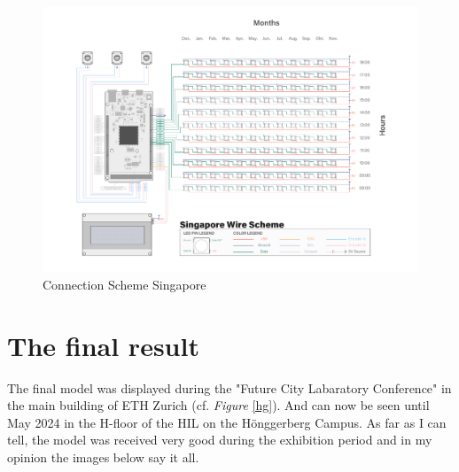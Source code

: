 \documentclass[a4paper,9pt]{article}
\begin{document}
\begin{landscape}
     \begin{figure}[H]
        \centering
        \includegraphics[width=\linewidth, trim={50 50 50 50}]{Images/schaltplan SG.pdf}
        \caption{Connection Scheme Singapore}
        \label{scheme SG}
    \end{figure}

\end{landscape}

\section{The final result}
The final model was displayed during the "Future City Labaratory Conference" in the main building of ETH Zurich (cf. \textit{Figure} \ref{hg}). And can now be seen until May 2024 in the H-floor of the HIL on the Hönggerberg Campus. As far as I can tell, the model was received very good during the exhibition period and in my opinion the images below say it all.
\end{document}
